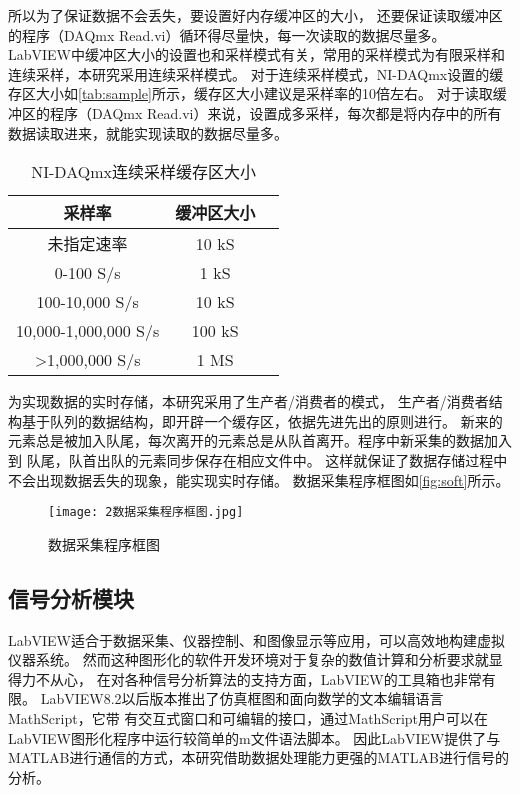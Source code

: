 所以为了保证数据不会丢失，要设置好内存缓冲区的大小，
还要保证读取缓冲区的程序（DAQmx Read.vi）循环得尽量快，每一次读取的数据尽量多。
LabVIEW中缓冲区大小的设置也和采样模式有关，常用的采样模式为有限采样和连续采样，本研究采用连续采样模式。
对于连续采样模式，NI-DAQmx设置的缓存区大小如\autoref{tab:sample}所示，缓存区大小建议是采样率的10倍左右。
对于读取缓冲区的程序（DAQmx Read.vi）来说，设置成多采样，每次都是将内存中的所有数据读取进来，就能实现读取的数据尽量多。
\begin{table}[htbp]
    \centering
    \caption{\label{tab:sample}NI-DAQmx连续采样缓存区大小}
    \begin{tabular}{ccc}
     \toprule
     采样率&缓冲区大小\\
     \midrule
     未指定速率&10 kS\\
     0-100 S/s&1 kS\\
     100-10,000 S/s&10 kS\\
     10,000-1,000,000 S/s&100 kS\\
     >1,000,000 S/s&1 MS\\
     \bottomrule
    \end{tabular}
\end{table}

为实现数据的实时存储，本研究采用了生产者/消费者的模式，
生产者/消费者结构基于队列的数据结构，即开辟一个缓存区，依据先进先出的原则进行\cite{马瑾2015基于}。
新来的元素总是被加入队尾，每次离开的元素总是从队首离开。程序中新采集的数据加入到
队尾，队首出队的元素同步保存在相应文件中。
这样就保证了数据存储过程中不会出现数据丢失的现象，能实现实时存储。
数据采集程序框图如\autoref{fig:soft}所示。
\begin{figure}[htbp]
    \centering
    \texttt{[image: 2数据采集程序框图.jpg]}
    \caption{\label{fig:soft}数据采集程序框图}
\end{figure}


\subsection{信号分析模块}
LabVIEW适合于数据采集、仪器控制、和图像显示等应用，可以高效地构建虚拟仪器系统。
然而这种图形化的软件开发环境对于复杂的数值计算和分析要求就显得力不从心，
在对各种信号分析算法的支持方面，LabVIEW的工具箱也非常有限。
LabVIEW8.2以后版本推出了仿真框图和面向数学的文本编辑语言MathScript，它带
有交互式窗口和可编辑的接口，通过MathScript用户可以在LabVIEW图形化程序中运行较简单的m文件语法脚本\cite{周惠2007LabVIEW,柴敬安2008Labview}。
因此LabVIEW提供了与MATLAB进行通信的方式，本研究借助数据处理能力更强的MATLAB进行信号的分析。


